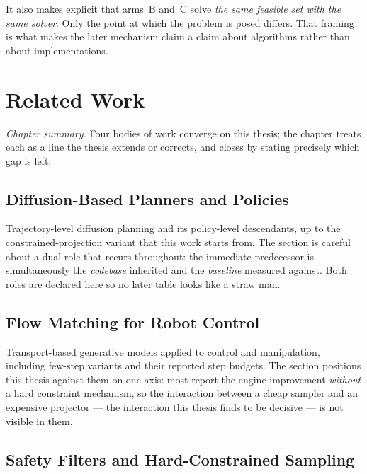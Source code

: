 \documentclass[headsepline,footsepline,footinclude=false,oneside,fontsize=11pt,paper=a4,listof=totoc,bibliography=totoc]{scrbook}
\begin{document}
It also makes explicit that arms~B and~C solve \emph{the same feasible set with the same
solver}. Only the point at which the problem is posed differs. That framing is what makes
the later mechanism claim a claim about algorithms rather than about implementations.

\chapter{Related Work}\label{ch:related}

\emph{Chapter summary.} Four bodies of work converge on this thesis; the chapter treats each
as a line the thesis extends or corrects, and closes by stating precisely which gap is left.

\section{Diffusion-Based Planners and Policies}\label{sec:rel:diffusion}

Trajectory-level diffusion planning and its policy-level descendants, up to the
constrained-projection variant that this work starts from. The section is careful about a
dual role that recurs throughout: the immediate predecessor is simultaneously the
\emph{codebase} inherited and the \emph{baseline} measured against. Both roles are declared
here so no later table looks like a straw man.

\section{Flow Matching for Robot Control}\label{sec:rel:fm}

Transport-based generative models applied to control and manipulation, including
few-step variants and their reported step budgets. The section positions this thesis
against them on one axis: most report the engine improvement \emph{without} a hard
constraint mechanism, so the interaction between a cheap sampler and an expensive projector
--- the interaction this thesis finds to be decisive --- is not visible in them.

\section{Safety Filters and Hard-Constrained Sampling}\label{sec:rel:safety}
\end{document}
